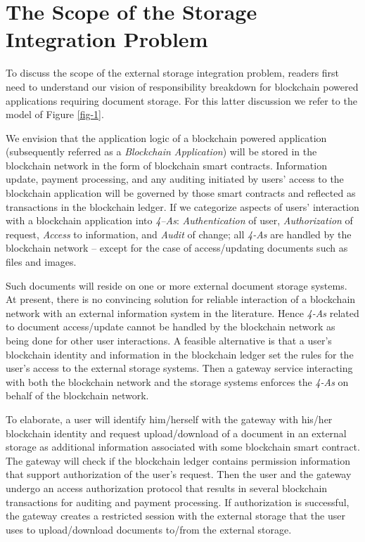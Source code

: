 \section{The Scope of the Storage Integration Problem}
\label{s-scope}
To discuss the scope of the external storage integration problem, readers first need to understand our vision of responsibility breakdown for blockchain powered applications requiring document storage. For this latter discussion we refer to the model of Figure \ref{fig-1}.

We envision that the application logic of a blockchain powered application (subsequently referred as a \textit{Blockchain Application}) will be stored in the blockchain network in the form of blockchain smart contracts. Information update, payment processing, and any auditing initiated by users' access to the blockchain application will be governed by those smart contracts and reflected as transactions in the blockchain ledger. If we categorize aspects of users' interaction with a blockchain application into \textit{4--As}: \textit{Authentication} of user, \textit{Authorization} of request, \textit{Access} to information, and \textit{Audit} of change; all \textit{4-As} are handled by the blockchain network -- except for the case of access/updating documents such as files and images.

Such documents will reside on one or more external document storage systems. At present, there is no convincing solution for reliable interaction of a blockchain network with an external information system in the literature. Hence \textit{4-As} related to document access/update cannot be handled by the blockchain network as being done for other user interactions. A feasible alternative is that a user's blockchain identity and information in the blockchain ledger set the rules for the user's access to the external storage systems. Then a gateway service interacting with both the blockchain network and the storage systems enforces the \textit{4-As} on behalf of the blockchain network.

To elaborate, a user will identify him/herself with the gateway with his/her blockchain identity and request upload/download of a document in an external storage as additional information associated with some blockchain smart contract. The gateway will check if the blockchain ledger contains permission information that support authorization of the user's request. Then the user and the gateway undergo an access authorization protocol that results in several blockchain transactions for auditing and payment processing. If authorization is successful, the gateway creates a restricted session with the external storage that the user uses to upload/download documents to/from the external storage.

